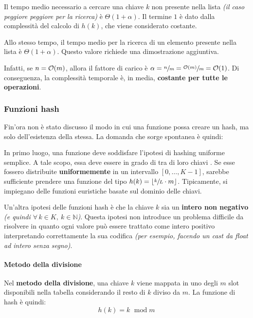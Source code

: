 \documentclass[italian, 10pt]{article}
\DeclareMathOperator{\modop}{\ mod}
\begin{document}
Il tempo medio necessario a cercare una chiave \(k\) non presente nella lista \textit{(il caso peggiore peggiore per la ricerca)} è \(\Theta(1 + \alpha)\).
Il termine \(1\) è dato dalla complessità del calcolo di \(h(k)\), che viene considerato costante.

\bigskip
Allo stesso tempo, il tempo medio per la ricerca di un elemento presente nella lista è \(\Theta(1+\alpha)\).
Questo valore richiede una dimostrazione aggiuntiva.

Infatti, se \(n = \mathcal{O}(m)\), allora il fattore di carico è \(\alpha = \sfrac{n}{m} = \sfrac{\mathcal{O}(m)}{m} = \mathcal{O}(1)\).
Di conseguenza, la complessità temporale è, in media, \textbf{costante per tutte le operazioni}.

\subsubsection{Funzioni hash}

Fin'ora non è stato discusso il modo in cui una funzione possa creare un hash, ma solo dell'esistenza della stessa.
La domanda che sorge spontanea è quindi:


In primo luogo, una funzione deve soddisfare l'ipotesi di hashing uniforme semplice.
A tale scopo, essa deve essere in grado di  tra di loro chiavi .
Se esse fossero distribuite \textbf{uniformemente} in un intervallo \([0, \ldots, K-1]\), sarebbe sufficiente prendere una funzione del tipo \(h(k) = \lfloor \sfrac{k}{L} \cdot m \rfloor\).
Tipicamente, si impiegano delle funzioni euristiche basate sul dominio delle chiavi.

Un'altra ipotesi delle funzioni hash è che la chiave \(k\) sia un \textbf{intero non negativo} \textit{(e quindi \(\forall \, k \in K, \ k \in \mathbb{N}\))}.
Questa ipotesi non introduce un problema difficile da risolvere in quanto ogni valore può essere trattato come intero positivo interpretando correttamente la sua codifica \textit{(per esempio, facendo un cast da float ad intero senza segno)}.

\paragraph{Metodo della divisione}

Nel \textbf{metodo della divisione}, una chiave \(k\) viene mappata in uno degli \(m\) slot disponibili nella tabella considerando il resto di \(k\) diviso da \(m\).
La funzione di hash è quindi:
\[ h(k) = k \modop m \]
\end{document}
